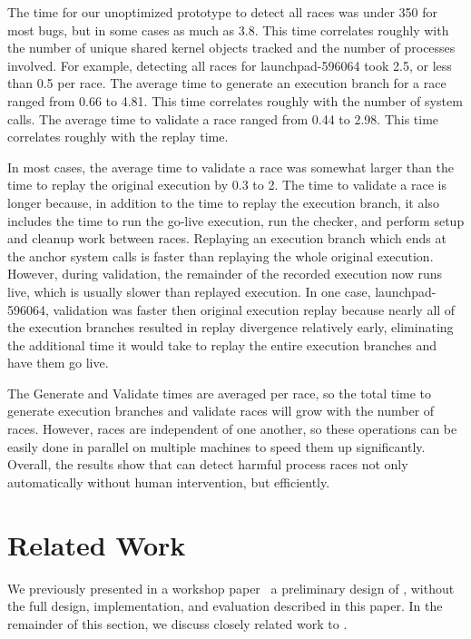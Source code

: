 The time for our unoptimized prototype to detect all races was under
350\ms{} for most bugs, but in some cases as much as 3.8\secs{}.  
This time correlates roughly with the number of unique shared kernel
objects tracked and the number of processes involved.  
For example, detecting all races for launchpad-596064 took 2.5\secs{},
or less than 0.5\ms{} per race.
The average time to generate an execution branch for a race ranged from
0.66\secs{} to 4.81\secs{}.  This time correlates roughly with the
number of system calls.  The average time to validate a race ranged
from 0.44\secs{} to 2.98\secs{}.  This time correlates roughly with
the replay time.  

In most cases, the average time to validate a race was somewhat larger
than the time to replay the original execution by 0.3\secs{} to
2\secs{}. The time to validate a race is longer because, in addition to
the time to replay the execution branch, it also includes the time to
run the go-live execution, run the checker, and perform setup and
cleanup work between races. Replaying an execution branch which ends
at the anchor system calls is faster than replaying the whole original
execution.  However, during validation, the remainder of the recorded
execution now runs live, which is usually slower than replayed
execution. In one case, launchpad-596064, validation was faster then
original execution replay because nearly all of the execution branches
resulted in replay divergence relatively early, eliminating the
additional time it would take to replay the entire execution branches
and have them go live.

The Generate and Validate times are averaged per race, so the total
time to generate execution branches and validate races will grow with
the number of races.  However, races are independent of one another,
so these operations can be easily done in parallel on multiple
machines to speed them up significantly.  Overall, the results show
that \racepro can detect harmful process races not only automatically
without human intervention, but efficiently.

\section{Related Work} \label{racepro:sec:related}

We previously presented in a workshop paper~\cite{racepro:hotos11} a
preliminary design of \racepro, without the full design, implementation, and
evaluation described in this paper.  In the remainder of this section, we
discuss closely related work to \racepro.

